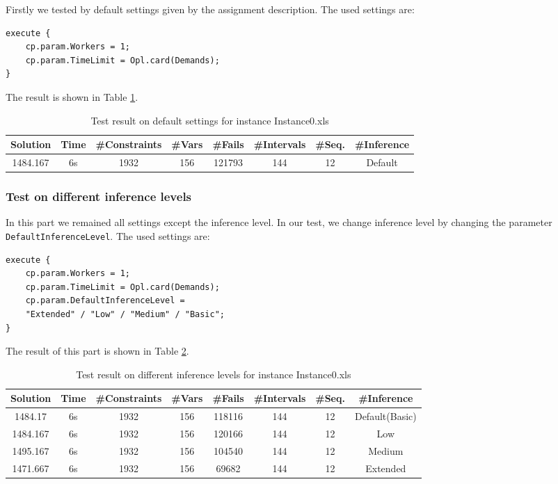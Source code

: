\documentclass[a4paper, 12pt]{article}
\begin{document}
Firstly we tested by default settings given by the assignment description. The used settings are: 

\begin{lstlisting}
execute {
    cp.param.Workers = 1;
    cp.param.TimeLimit = Opl.card(Demands); 
}
\end{lstlisting}

The result is shown in Table \ref{default0}. 

\begin{table}
    \centering
    \caption{Test result on default settings for instance Instance0.xls}
    \label{default0}
    \begin{tabular}{|c|c|c|c|c|c|c|c|}
        \hline
        Solution & Time & \#Constraints & \#Vars & \#Fails & \#Intervals & \#Seq. & \#Inference \\
        \hline
        1484.167 & 6s & 1932 & 156 & 121793 & 144 & 12 & Default \\
        \hline
    \end{tabular}
\end{table}

\subsubsection{Test on different inference levels}

In this part we remained all settings except the inference level. In our test, we change inference level by changing the parameter \texttt{DefaultInferenceLevel}. The used settings are: 

\begin{lstlisting}
execute {
    cp.param.Workers = 1;
    cp.param.TimeLimit = Opl.card(Demands); 
    cp.param.DefaultInferenceLevel = 
    "Extended" / "Low" / "Medium" / "Basic";
}
\end{lstlisting}

The result of this part is shown in Table \ref{diffInfer0}. 

\begin{table}
    \centering
    \caption{Test result on different inference levels for instance Instance0.xls}
    \label{diffInfer0}
    \begin{tabular}{|c|c|c|c|c|c|c|c|}
        \hline
        Solution & Time & \#Constraints & \#Vars & \#Fails & \#Intervals & \#Seq. & \#Inference \\
        \hline
        1484.17 & 6s & 1932 & 156 & 118116 & 144 & 12 & Default(Basic) \\
        \hline 
        1484.167 & 6s & 1932 & 156 & 120166 & 144 & 12 & Low \\
        \hline
        1495.167 & 6s & 1932 & 156 & 104540 & 144 & 12 & Medium \\
        \hline
        1471.667 & 6s & 1932 & 156 & 69682 & 144 & 12 & Extended \\
        \hline
    \end{tabular}
\end{table}
\end{document}
